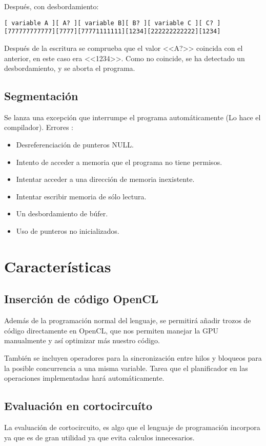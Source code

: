 \documentclass[12pt,a4paper]{article}
\begin{document}
Después, con desbordamiento:
\begin{lstlisting}
[ variable A ][ A? ][ variable B][ B? ][ variable C ][ C? ]
[777777777777][7777][77771111111][1234][222222222222][1234]
\end{lstlisting}

Después de la escritura se comprueba que el valor <<A?>> coincida con el 
anterior, en este caso era <<1234>>. Como no coincide, se ha detectado un 
desbordamiento, y se aborta el programa.

\subsection
{Segmentación}
Se lanza una excepción que interrumpe el programa automáticamente (Lo hace el
compilador).
Errores :
\begin{itemize}
\item Desreferenciación de punteros NULL.
\item Intento de acceder a memoria que el programa no tiene permisos.
\item Intentar acceder a una dirección de memoria inexistente.
\item Intentar escribir memoria de sólo lectura.
\item Un desbordamiento de búfer.
\item Uso de punteros no inicializados.
\end{itemize}



\section{Características}

\subsection
{Inserción de código OpenCL}
Además de la programación normal del lenguaje, se permitirá añadir trozos de
código directamente en OpenCL, que nos permiten manejar la GPU manualmente y así
optimizar más nuestro código.

También se incluyen operadores para la sincronización entre hilos y bloqueos 
para la posible concurrencia a una misma variable. Tarea que el planificador en 
las operaciones implementadas hará automáticamente.
 
\subsection
{Evaluación en cortocircuíto}
La evaluación de cortocircuito, es algo que el lenguaje de programación 
incorpora ya que es de gran utilidad ya que evita calculos innecesarios.
\end{document}
